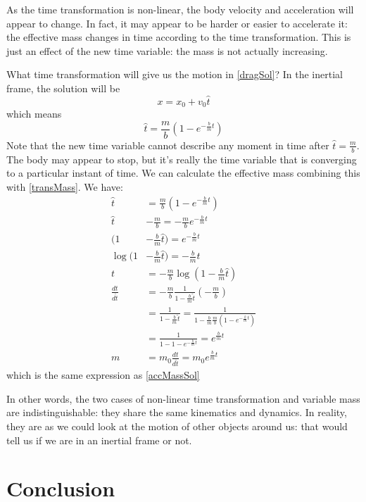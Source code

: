 \documentclass[aps,pra,10pt,twocolumn,floatfix,nofootinbib]{revtex4-1}
\theoremstyle{definition}
\begin{document}
As the time transformation is non-linear, the body velocity and acceleration will appear to change. In fact, it may appear to be harder or easier to accelerate it: the effective mass changes in time according to the time transformation. This is just an effect of the new time variable: the mass is not actually increasing.

What time transformation will give us the motion in \eqref{dragSol}? In the inertial frame, the solution will be
\begin{equation}
x=x_0+v_0\hat{t}
\end{equation}
which means
\begin{equation}
\hat{t} = \frac{m}{b}(1-e^{-\frac{b}{m}t})
\end{equation}
Note that the new time variable cannot describe any moment in time after $\hat{t} = \frac{m}{b}$. The body may appear to stop, but it's really the time variable that is converging to a particular instant of time. We can calculate the effective mass combining this with \eqref{transMass}. We have:
\begin{align*}
\hat{t} &= \frac{m}{b}(1-e^{-\frac{b}{m}t}) \\
\hat{t} &- \frac{m}{b} = -\frac{m}{b}e^{-\frac{b}{m}t} \\
(1&- \frac{b}{m}\hat{t}) = e^{-\frac{b}{m}t} \\
\log(1&- \frac{b}{m}\hat{t})= -\frac{b}{m}t \\
t&= -\frac{m}{b}\log(1- \frac{b}{m}\hat{t}) \\
\frac{dt}{d\hat{t}} &= -\frac{m}{b} \frac{1}{1- \frac{b}{m}\hat{t}} (-\frac{m}{b})  \\
&= \frac{1}{1- \frac{b}{m}\hat{t}}
= \frac{1}{1- \frac{b}{m}\frac{m}{b}(1-e^{-\frac{b}{m}t})} \\
&=\frac{1}{1-1-e^{-\frac{b}{m}t}} =e^{\frac{b}{m}t} \\
m&=m_0\frac{dt}{d\hat{t}}=m_0e^{\frac{b}{m}t}
\end{align*}
which is the same expression as \eqref{accMassSol}

In other words, the two cases of non-linear time transformation and variable mass are indistinguishable: they share the same kinematics and dynamics. In reality, they are as we could look at the motion of other objects around us: that would tell us if we are in an inertial frame or not.

\section{Conclusion}
\end{document}
